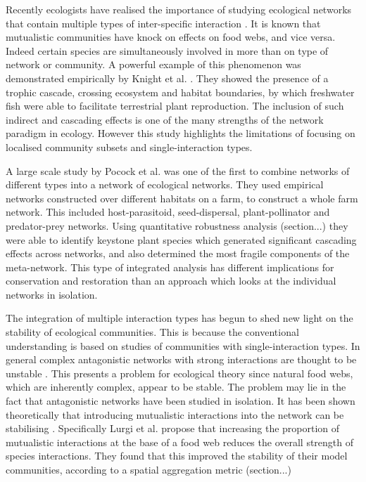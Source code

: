 \documentclass[12pt]{article}
\begin{document}

Recently ecologists have realised the importance of studying ecological networks that contain multiple types of inter-specific interaction \cite{fontaine2011ecological, kefi2012more, montoya2015functional}. It is known that mutualistic communities have knock on effects on food webs, and vice versa. Indeed certain species are simultaneously involved in more than on type of network or community. A powerful example of this phenomenon was demonstrated empirically by Knight et al. \cite{knight2005trophic}. They showed the presence of a trophic cascade, crossing ecosystem and habitat boundaries, by which freshwater fish were able to facilitate terrestrial plant reproduction. The inclusion of such indirect and cascading effects is one of the many strengths of the network paradigm in ecology. However this study highlights the limitations of focusing on localised community subsets and single-interaction types.

A large scale study by Pocock et al. \cite{pocock2012robustness} was one of the first to combine networks of different types into a network of ecological networks. They used empirical networks constructed over different habitats on a farm, to construct a whole farm network. This included host-parasitoid, seed-dispersal, plant-pollinator and predator-prey networks. Using quantitative robustness analysis (section...) they were able to identify keystone plant species which generated significant cascading effects across networks, and also determined the most fragile components of the meta-network. This type of integrated analysis has different implications for conservation and restoration than an approach which looks at the individual networks in isolation.

The integration of multiple interaction types has begun to shed new light on the stability of ecological communities. This is because the conventional understanding is based on studies of communities with single-interaction types. In general complex antagonistic networks with strong interactions are thought to be unstable \cite{o2009perturbations}. This presents a problem for ecological theory since natural food webs, which are inherently complex, appear to be stable. The problem may lie in the fact that antagonistic networks have been studied in isolation. It has been shown theoretically that introducing mutualistic interactions into the network can be stabilising \cite{mougi2012diversity, lurgi2015effects}. Specifically Lurgi et al. \cite{lurgi2015effects} propose that increasing the proportion of mutualistic interactions at the base of a food web reduces the overall strength of species interactions. They found that this improved the stability of their model communities, according to a spatial aggregation metric (section...) 
\end{document}
